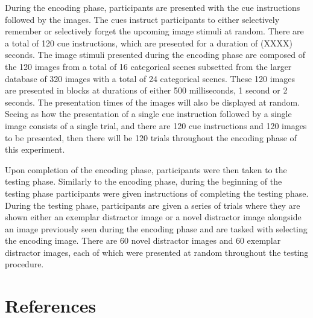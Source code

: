 \documentclass[
  man,floatsintext]{apa6}
\begin{document}
During the encoding phase, participants are presented with the cue instructions followed by the images. The cues instruct participants to either selectively remember or selectively forget the upcoming image stimuli at random. There are a total of 120 cue instructions, which are presented for a duration of (XXXX) seconds. The image stimuli presented during the encoding phase are composed of the 120 images from a total of 16 categorical scenes subsetted from the larger database of 320 images with a total of 24 categorical scenes. These 120 images are presented in blocks at durations of either 500 milliseconds, 1 second or 2 seconds. The presentation times of the images will also be displayed at random. Seeing as how the presentation of a single cue instruction followed by a single image consists of a single trial, and there are 120 cue instructions and 120 images to be presented, then there will be 120 trials throughout the encoding phase of this experiment.

Upon completion of the encoding phase, participants were then taken to the testing phase. Similarly to the encoding phase, during the beginning of the testing phase participants were given instructions of completing the testing phase. During the testing phase, participants are given a series of trials where they are shown either an exemplar distractor image or a novel distractor image alongside an image previously seen during the encoding phase and are tasked with selecting the encoding image. There are 60 novel distractor images and 60 exemplar distractor images, each of which were presented at random throughout the testing procedure.

\newpage

\hypertarget{references}{%
\section{References}\label{references}}

\begingroup
\setlength{\parindent}{-0.5in}
\setlength{\leftskip}{0.5in}
\end{document}
